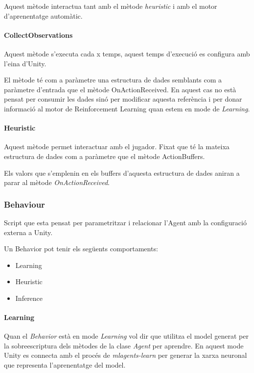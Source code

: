\documentclass{article}
\begin{document}
    Aquest mètode interactua tant amb el mètode \textit{heuristic} i amb el motor d'aprenentatge automàtic.
    
    \paragraph{CollectObservations}
    Aquest mètode s'executa cada x temps, aquest temps d'execució es configura amb l'eina d'Unity.
    
    El mètode té com a paràmetre una estructura de dades semblants com a paràmetre d'entrada que el mètode OnActionReceived. En aquest cas no està pensat per consumir les dades sinó per modificar aquesta referència i per donar informació al motor de Reinforcement Learning quan estem en mode de \textit{Learning}.


    \paragraph{Heuristic}
    Aquest mètode permet interactuar amb el jugador. Fixat que té la mateixa estructura de dades com a paràmetre que el mètode ActionBuffers.
    
    Els valors que s'emplenin en els buffers d'aquesta estructura de dades aniran a parar al mètode \textit{OnActionReceived}.
    
    \newpage
    
    \subsubsection{Behaviour}
    Script que esta pensat per parametritzar i relacionar l’Agent amb la configuració externa a Unity.
    
    Un Behavior pot tenir els següents comportaments:
    \begin{itemize}
        \item Learning
        \item Heuristic
        \item Inference
    \end{itemize}
    
  \paragraph{Learning}
    Quan el \textit{Behavior} està en mode \textit{Learning} vol dir que utilitza el model generat per la sobreescriptura dels mètodes de la clase \textit{Agent} per aprendre. En aquest mode Unity es connecta amb el procés de \textit{mlagents-learn} per generar la xarxa neuronal que representa l'aprenentatge del model.
    
\end{document}
